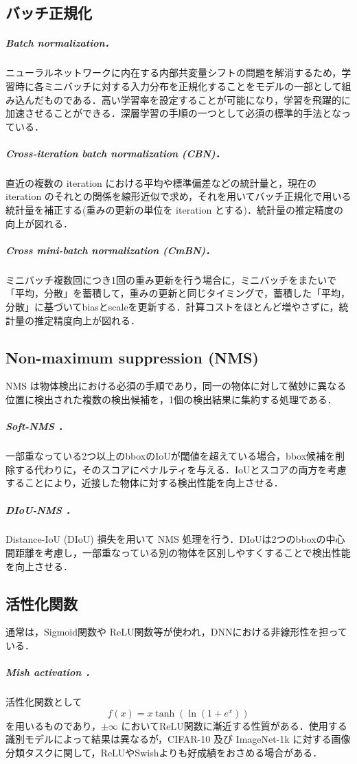 \documentclass[twocolumn]{jsarticle} %
\begin{document}
\subsection{バッチ正規化 \label{seq:batch}}
\subparagraph{Batch normalization\cite{IoffeSzege15}．} ニューラルネットワークに内在する内部共変量シフトの問題を解消するため，学習時に各ミニバッチに対する入力分布を正規化することをモデルの一部として組み込んだものである．高い学習率を設定することが可能になり，学習を飛躍的に加速させることができる．深層学習の手順の一つとして必須の標準的手法となっている．

\subparagraph{Cross-iteration batch normalization (CBN)\cite{YCZHL20}．}直近の複数の iteration における平均や標準偏差などの統計量と，現在の iteration のそれとの関係を線形近似で求め，それを用いてバッチ正規化で用いる統計量を補正する(重みの更新の単位を iteration とする)．統計量の推定精度の向上が図れる．

\subparagraph{Cross mini-batch normalization (CmBN)\cite{BWL20}．\label{seq:CmBN}} ミニバッチ複数回につき1回の重み更新を行う場合に，ミニバッチをまたいで「平均，分散」を蓄積して，重みの更新と同じタイミングで，蓄積した「平均，分散」に基づいてbiasとscaleを更新する．計算コストをほとんど増やさずに，統計量の推定精度向上が図れる．

\subsection{Non-maximum suppression (NMS)}
NMS は物体検出における必須の手順であり，同一の物体に対して微妙に異なる位置に検出された複数の検出候補を，1個の検出結果に集約する処理である．

\subparagraph{Soft-NMS \cite{BSCD17}．} \label{sec:soft_NMS} 一部重なっている2つ以上のbboxのIoUが閾値を超えている場合，bbox候補を削除する代わりに，そのスコアにペナルティを与える．IoUとスコアの両方を考慮することにより，近接した物体に対する検出性能を向上させる．

\subparagraph{DIoU-NMS \cite{ZWLLYR20}．} Distance-IoU (DIoU) 損失を用いて NMS 処理を行う．DIoUは2つのbboxの中心間距離を考慮し，一部重なっている別の物体を区別しやすくすることで検出性能を向上させる．

\subsection{活性化関数}
通常は，Sigmoid関数\cite{RHW86}や ReLU関数\cite{NaiHin10}等が使われ，DNNにおける非線形性を担っている．

\subparagraph{Mish activation \cite{Misra20}．}
活性化関数として $$f(x) = x \tanh(\ln(1 + e^x))$$ を用いるものであり，$\pm\infty$ においてReLU関数に漸近する性質がある．使用する識別モデルによって結果は異なるが，CIFAR-10 及び ImageNet-1k に対する画像分類タスクに関して，ReLUやSwish\cite{RZL18}よりも好成績をおさめる場合がある．
\end{document}
